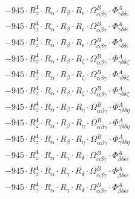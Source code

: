 \documentclass{article}
\begin{document}
\begin{subequations}
\begin{gather}
\begin{array}{c}
 \\[0.2em] 		 - 945 \cdot R_{z}^{4} \cdot R_{\alpha{}} \cdot R_{\beta{}} \cdot R_{\epsilon{}} \cdot \Omega{}^{B}_{\alpha{}\beta{}\gamma{}} \cdot \Phi{}^{A}_{\gamma{}\delta{}\delta{}\epsilon{}} 
 \\[0.2em] 		 - 945 \cdot R_{z}^{4} \cdot R_{\alpha{}} \cdot R_{\beta{}} \cdot R_{\epsilon{}} \cdot \Omega{}^{B}_{\alpha{}\beta{}\gamma{}} \cdot \Phi{}^{A}_{\gamma{}\delta{}\delta{}\epsilon{}} 
 \\[0.2em] 		 - 945 \cdot R_{z}^{4} \cdot R_{\alpha{}} \cdot R_{\beta{}} \cdot R_{\epsilon{}} \cdot \Omega{}^{B}_{\alpha{}\beta{}\gamma{}} \cdot \Phi{}^{A}_{\gamma{}\delta{}\delta{}\epsilon{}} 
 \\[0.2em] 		 - 945 \cdot R_{z}^{4} \cdot R_{\alpha{}} \cdot R_{\beta{}} \cdot R_{\zeta{}} \cdot \Omega{}^{B}_{\alpha{}\beta{}\gamma{}} \cdot \Phi{}^{A}_{\gamma{}\delta{}\delta{}\zeta{}} 
 \\[0.2em] 		 - 945 \cdot R_{z}^{4} \cdot R_{\alpha{}} \cdot R_{\beta{}} \cdot R_{\zeta{}} \cdot \Omega{}^{B}_{\alpha{}\beta{}\gamma{}} \cdot \Phi{}^{A}_{\gamma{}\delta{}\delta{}\zeta{}} 
 \\[0.2em] 		 - 945 \cdot R_{z}^{4} \cdot R_{\alpha{}} \cdot R_{\beta{}} \cdot R_{\zeta{}} \cdot \Omega{}^{B}_{\alpha{}\beta{}\gamma{}} \cdot \Phi{}^{A}_{\gamma{}\delta{}\delta{}\zeta{}} 
 \\[0.2em] 		 - 945 \cdot R_{z}^{4} \cdot R_{\alpha{}} \cdot R_{\beta{}} \cdot R_{\eta{}} \cdot \Omega{}^{B}_{\alpha{}\beta{}\gamma{}} \cdot \Phi{}^{A}_{\gamma{}\delta{}\delta{}\eta{}} 
 \\[0.2em] 		 - 945 \cdot R_{z}^{4} \cdot R_{\alpha{}} \cdot R_{\beta{}} \cdot R_{\eta{}} \cdot \Omega{}^{B}_{\alpha{}\beta{}\gamma{}} \cdot \Phi{}^{A}_{\gamma{}\delta{}\delta{}\eta{}} 
 \\[0.2em] 		 - 945 \cdot R_{z}^{4} \cdot R_{\alpha{}} \cdot R_{\beta{}} \cdot R_{\eta{}} \cdot \Omega{}^{B}_{\alpha{}\beta{}\gamma{}} \cdot \Phi{}^{A}_{\gamma{}\delta{}\delta{}\eta{}} 
 \\[0.2em] 		 - 945 \cdot R_{z}^{4} \cdot R_{\alpha{}} \cdot R_{\gamma{}} \cdot R_{\delta{}} \cdot \Omega{}^{B}_{\alpha{}\beta{}\gamma{}} \cdot \Phi{}^{A}_{\beta{}\delta{}\epsilon{}\epsilon{}} 
 \\[0.2em] 		 - 945 \cdot R_{z}^{4} \cdot R_{\alpha{}} \cdot R_{\gamma{}} \cdot R_{\delta{}} \cdot \Omega{}^{B}_{\alpha{}\beta{}\gamma{}} \cdot \Phi{}^{A}_{\beta{}\delta{}\epsilon{}\epsilon{}} 
 \\[0.2em] 		 - 945 \cdot R_{z}^{4} \cdot R_{\alpha{}} \cdot R_{\gamma{}} \cdot R_{\delta{}} \cdot \Omega{}^{B}_{\alpha{}\beta{}\gamma{}} \cdot \Phi{}^{A}_{\beta{}\delta{}\epsilon{}\epsilon{}} 

\end{array}
\end{gather}
\end{subequations}
\end{document}
